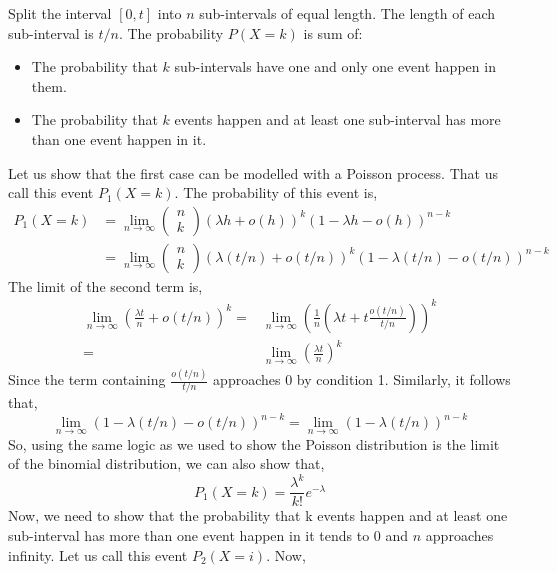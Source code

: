 \documentclass{article}
\begin{document}
Split the interval $[0, t]$ into $n$ sub-intervals of equal length. The length of each sub-interval is $t / n$. The probability $P(X = k)$ is sum of:
\begin{itemize}
    \item The probability that $k$ sub-intervals have one and only one event happen in them.
    \item The probability that $k$ events happen and at least one sub-interval has more than one event happen in it.
\end{itemize}
Let us show that the first case can be modelled with a Poisson process. That us call this event $P_1(X = k)$. The probability of this event is,
\begin{align*}
    P_1(X = k) & = \lim_{n \rightarrow \infty}\begin{pmatrix} n \\ k \end{pmatrix}(\lambda h + o(h)) ^ k (1 - \lambda h - o(h)) ^ {n - k} \\
    & = \lim_{n \rightarrow \infty}\begin{pmatrix} n \\ k \end{pmatrix}(\lambda (t / n) + o(t / n)) ^ k (1 - \lambda (t/n) - o(t/n)) ^ {n - k}
\end{align*}
The limit of the second term is,
\begin{align*}
    \lim_{n \rightarrow \infty} \left( \frac{\lambda t}{n} + o(t / n) \right)^k = & \lim_{n \rightarrow \infty} \left( \frac{1}{n} \left( \lambda t + t\frac{o(t / n)}{t / n} \right) \right)^k \\
    = & \lim_{n \rightarrow \infty} \left( \frac{\lambda t}{n} \right) ^ k
\end{align*}
Since the term containing $\frac{o(t / n)}{t / n}$ approaches 0 by condition 1. Similarly, it follows that,
\begin{equation*}
    \lim_{n \rightarrow \infty} (1 - \lambda(t / n) - o(t / n)) ^ {n - k} = \lim_{n \rightarrow \infty}(1 - \lambda (t / n)) ^ {n - k}
\end{equation*}
So, using the same logic as we used to show the Poisson distribution is the limit of the binomial distribution, we can also show that,
\begin{equation*}
    P_1(X = k) = \frac{\lambda^k}{k!} e^{- \lambda}
\end{equation*}
Now, we need to show that the probability that k events happen and at least one sub-interval has more than one event happen in it tends to 0 and $n$ approaches infinity. Let us call this event $P_2(X = i)$. Now,
\end{document}
